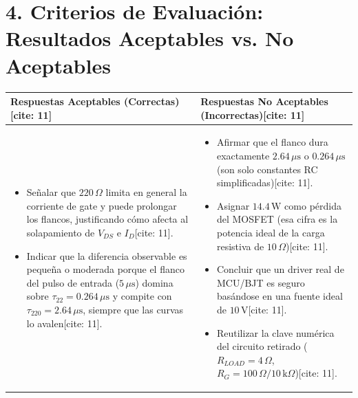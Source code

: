 \documentclass[11pt, a4paper]{article}
\begin{document}
\section*{4. Criterios de Evaluación: Resultados Aceptables vs. No Aceptables}
\noindent
\begin{tabularx}{\textwidth}{@{} >{\raggedright\arraybackslash}X >{\raggedright\arraybackslash}X @{}}
\toprule
\textbf{\textcolor{green!50!black}{Respuestas Aceptables (Correctas)}}[cite: 11] & \textbf{\textcolor{red!70!black}{Respuestas No Aceptables (Incorrectas)}}[cite: 11] \\ \midrule
\begin{itemize}[leftmargin=*, noitemsep, topsep=0pt]
    \item Señalar que $220\,\Omega$ limita en general la corriente de gate y puede prolongar los flancos, justificando cómo afecta al solapamiento de $V_{DS}$ e $I_D$[cite: 11].
    \item Indicar que la diferencia observable es pequeña o moderada porque el flanco del pulso de entrada ($5\,\mu\text{s}$) domina sobre $\tau_{22}=0.264\,\mu\text{s}$ y compite con $\tau_{220}=2.64\,\mu\text{s}$, siempre que las curvas lo avalen[cite: 11].
\end{itemize} &
\begin{itemize}[leftmargin=*, noitemsep, topsep=0pt]
    \item Afirmar que el flanco dura exactamente $2.64\,\mu\text{s}$ o $0.264\,\mu\text{s}$ (son solo constantes RC simplificadas)[cite: 11].
    \item Asignar $14.4\,\text{W}$ como pérdida del MOSFET (esa cifra es la potencia ideal de la carga resistiva de $10\,\Omega$)[cite: 11].
    \item Concluir que un driver real de MCU/BJT es seguro basándose en una fuente ideal de $10\,\text{V}$[cite: 11].
    \item Reutilizar la clave numérica del circuito retirado ($R_{LOAD}=4\,\Omega$, $R_G=100\,\Omega/10\,\text{k}\Omega$)[cite: 11].
\end{itemize} \\ \bottomrule
\end{tabularx}
\end{document}
